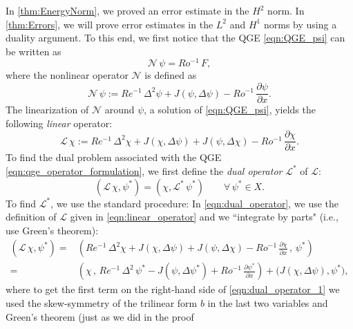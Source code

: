 In \autoref{thm:EnergyNorm}, we proved an error estimate in the $H^2$ norm.
In \autoref{thm:Errors}, we will prove error estimates in the $L^2$ and $H^1$
norms by using a duality argument. To this end, we first notice that the QGE
\eqref{eqn:QGE_psi} can be written as
\begin{equation}
  \mathcal{N} \, \psi = Ro^{-1} \, F ,
  \label{eqn:qge_operator_formulation}
\end{equation}
where the nonlinear operator $\mathcal{N}$ is defined as
\begin{equation}
  \mathcal{N} \, \psi := Re^{-1} \, \Delta^2 \psi + J(\psi , \Delta \psi)
    - Ro^{-1} \, \frac{\partial \psi}{\partial x} .
  \label{eqn:nonlinear_operator}
\end{equation}
The linearization of $\mathcal{N}$ around $\psi$, a solution of
\eqref{eqn:QGE_psi}, yields the following \emph{linear} operator:
\begin{equation}
  \mathcal{L} \, \chi := Re^{-1} \, \Delta^2 \chi + J(\chi , \Delta \psi) +
    J(\psi, \Delta \chi) - Ro^{-1} \, \frac{\partial \chi}{\partial x} .
  \label{eqn:linear_operator}
\end{equation}
To find the dual problem associated with the QGE
\eqref{eqn:qge_operator_formulation}, we first define the \emph{dual operator}
$\mathcal{L}^*$ of $\mathcal{L}$:
\begin{equation}
  (\mathcal{L} \, \chi , \psi^*) = ( \chi , \mathcal{L}^* \, \psi^*)
    \qquad \forall \, \psi^* \in X .
  \label{eqn:dual_operator}
\end{equation}
To find $\mathcal{L}^*$, we use the standard procedure:
In \eqref{eqn:dual_operator}, we use the definition of $\mathcal{L}$ given in \eqref{eqn:linear_operator} and we ``integrate by parts" (i.e., use Green's theorem):
\begin{align}
  (\mathcal{L} \, \chi , \psi^*) =& \left( Re^{-1} \, \Delta^2 \chi
    + J(\chi , \Delta \psi) + J(\psi, \Delta \chi)
    - Ro^{-1} \, \frac{\partial \chi}{\partial x} \, , \, \psi^* \right) \nonumber \\
  =& \left( \chi \, , \, Re^{-1} \, \Delta^2 \, \psi^* - J(\psi , \Delta \psi^* )
    + Ro^{-1} \, \frac{\partial \psi^*}{\partial x} \right)
    + \biggl( J(\chi , \Delta \psi) , \psi^* \biggr) ,
  \label{eqn:dual_operator_1}
\end{align}
where to get the first term on the right-hand side of
\eqref{eqn:dual_operator_1} we used the skew-symmetry of the trilinear form
$b$ in the last two variables and Green's theorem (just as we did in the proof
